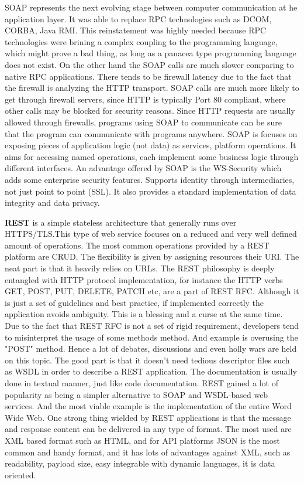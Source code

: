 SOAP represents the next evolving stage between computer communication at he application layer. It was able to replace RPC technologies such as DCOM, CORBA, Java RMI. This reinstatement was highly needed because RPC technologies were brining a complex coupling to the programming language, which might prove a bad thing, as long as a panacea type programming language does not exist. On the other hand the SOAP calls are much slower comparing to native RPC applications. There tends to be firewall latency due to the fact that the firewall is analyzing the HTTP transport. SOAP calls are much more likely to get through firewall servers, since HTTP is typically Port 80 compliant, where other calls may be blocked for security reasons. Since HTTP requests are usually allowed through firewalls, programs using SOAP to communicate can be sure that the program can communicate with programs anywhere. SOAP is focuses on exposing pieces of application logic (not data) as services, platform operations. It aims for accessing named operations, each implement some business logic through different interfaces. An advantage offered by SOAP is the WS-Security which adds some enterprise security features. Supports identity through intermediaries, not just point to point (SSL). It also provides a standard implementation of data integrity and data privacy.

\textbf{REST} is a simple stateless architecture that generally runs over HTTPS/TLS.This type of web service focuses on a reduced and very well defined amount of operations. The most common operations provided by a REST platform are CRUD. The flexibility is given by assigning resources their URI. The neat part is that it heavily relies on URLs. The REST philosophy is deeply entangled with HTTP protocol implementation, for instance the HTTP verbs GET, POST, PUT, DELETE, PATCH etc, are a part of REST RFC. Although it is just a set of guidelines and best practice, if implemented correctly the application avoids ambiguity. This is a blessing and a curse at the same time. Due to the fact that REST RFC is not a set of rigid requirement, developers tend to misinterpret the usage of some methods method. And example is overusing the "POST" method. Hence a lot of debates, discussions and even holly wars are held on this topic. The good part is that it doesn't need tedious descriptor files such as WSDL in order to describe a REST application. The documentation is usually done in textual manner, just like code documentation. REST gained a lot of popularity as being a simpler alternative to SOAP and WSDL-based web services. And the most viable example is the implementation of the entire Word Wide Web. One strong thing wielded by REST applications is that the message and response content can be delivered in any type of format. The most used are XML based format such as HTML, and for API platforms JSON is the most common and handy format, and it has lots of advantages against XML, such as readability, payload size, easy integrable with dynamic languages, it is data oriented.

